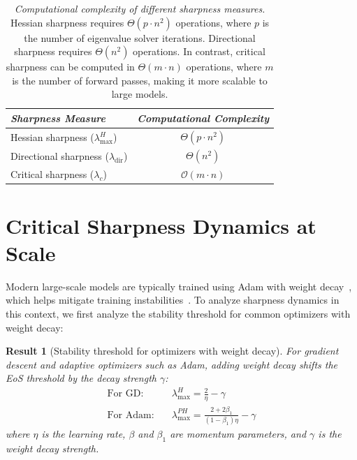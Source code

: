 \documentclass[]{fairmeta}
\theoremstyle{plain}
\newtheorem{result}[theorem]{Result}
\theoremstyle{definition}
\begin{document}
\begin{table}[!t]
    \centering
    \normalsize
    \renewcommand{\arraystretch}{1.4}
    \begin{tabular}{l|c}
        \hline
        \textit{Sharpness Measure} & \textit{Computational Complexity} \\
        \hline
        {Hessian sharpness} ($\lambda^H_{\max}$) & $\Theta(p \cdot n^2)$ \\
        \hline
        {Directional sharpness} ($\lambda_{\text{dir}}$) & $\Theta(n^2)$ \\
        \hline
        {Critical sharpness} ($\lambda_c$) & $\mathcal{O}(m \cdot n)$ \\
        \hline
    \end{tabular}
    \caption{\emph{Computational complexity of different sharpness measures.} Hessian sharpness requires $\Theta(p \cdot n^2)$ operations, where $p$ is the number of eigenvalue solver iterations.  Directional sharpness requires $\Theta(n^2)$ operations. In contrast, critical sharpness can be computed in $\Theta(m \cdot n)$ operations, where $m$ is the number of forward passes, making it more scalable to large models.}
    \label{table:computational_complexity_sharpness}
\end{table}


\section{Critical Sharpness Dynamics at Scale}



Modern large-scale models are typically trained using Adam with weight decay~\citep{adamwloshchilov2018}, which helps mitigate training instabilities~\citep{dangelo2024why}. To analyze sharpness dynamics in this context, we first analyze the stability threshold for common optimizers with weight decay:
\begin{result}[Stability threshold for optimizers with weight decay]
For gradient descent and adaptive optimizers such as Adam, adding weight decay shifts the EoS threshold by the decay strength $\gamma$:
\begin{align}
    \text{For GD:} \quad & \lambda^H_{\max} = \frac{2}{\eta} - \gamma \nonumber \\
    \text{For Adam:} \quad & \lambda^{PH}_{\max} = \frac{2 + 2\beta_1}{(1 - \beta_1)\eta} - \gamma
\end{align}
where $\eta$ is the learning rate, $\beta$ and $\beta_1$ are momentum parameters, and $\gamma$ is the weight decay strength.
\end{result}
\end{document}
